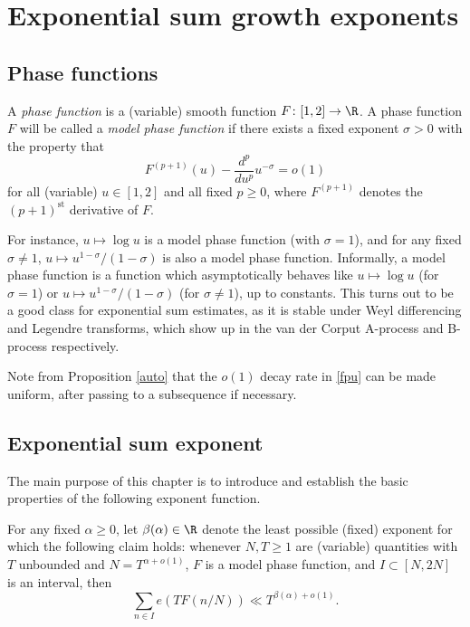 \chapter{Exponential sum growth exponents}\label{beta-chapter}

\section{Phase functions}

\begin{definition}\label{phase-def}
\leanok
A \emph{phase function} is a (variable) smooth function $F \colon [1,2] \to \R$.  A phase function $F$ will be called a \emph{model phase function} if there exists a fixed exponent $\sigma > 0$ with the property that
\begin{equation}\label{fpu}
F^{(p+1)}(u) - \frac{d^p}{du^p} u^{-\sigma} = o(1)
\end{equation}
for all (variable) $u \in [1,2]$ and all fixed $p \geq 0$, where $F^{(p+1)}$ denotes the $(p+1)^{\mathrm{st}}$ derivative of $F$.
\end{definition}

For instance, $u \mapsto \log u$ is a model phase function (with $\sigma=1$), and for any fixed $\sigma \neq 1$, $u \mapsto u^{1-\sigma}/(1-\sigma)$ is also a model phase function.  Informally, a model phase function is a function which asymptotically behaves like $u \mapsto \log u$ (for $\sigma = 1$) or $u \mapsto u^{1-\sigma}/(1-\sigma)$ (for $\sigma \neq 1$), up to constants.  This turns out to be a good class for exponential sum estimates, as it is stable under Weyl differencing and Legendre transforms, which show up in the van der Corput A-process and B-process respectively.

Note from Proposition \ref{auto} that the $o(1)$ decay rate in \eqref{fpu} can be made uniform, after passing to a subsequence if necessary.

\section{Exponential sum exponent}

The main purpose of this chapter is to introduce and establish the basic properties of the following exponent function.

\begin{definition}\label{beta-def}
\leanok
For any fixed $\alpha \geq 0$, let $\beta(\alpha) \in \R$ denote the least possible (fixed) exponent for which the following claim holds: whenever $N, T \geq 1$ are (variable) quantities with $T$ unbounded and $N = T^{\alpha+o(1)}$, $F$ is a model phase function, and $I \subset [N, 2N]$ is an interval, then
$$ \sum_{n \in I} e(T F(n/N)) \ll T^{\beta(\alpha)+o(1)}.$$
\end{definition}

